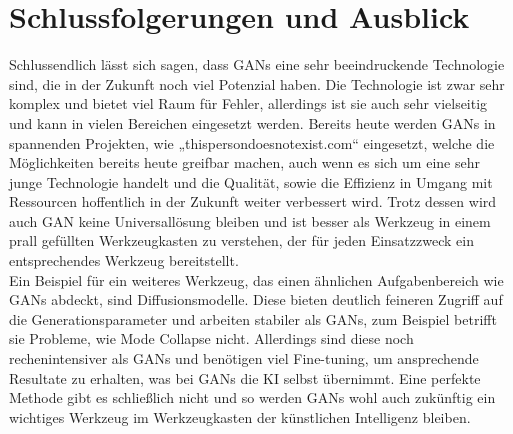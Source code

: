 \chapter{Schlussfolgerungen und Ausblick}

\noindent Schlussendlich lässt sich sagen, dass \acp{GAN} eine sehr beeindruckende Technologie sind, die in der Zukunft noch viel Potenzial haben. Die Technologie ist zwar sehr komplex und bietet viel Raum für Fehler, allerdings ist sie auch sehr vielseitig und kann in vielen Bereichen eingesetzt werden. Bereits heute werden \acp{GAN} in spannenden Projekten, wie „thispersondoesnotexist.com“ eingesetzt, welche die Möglichkeiten bereits heute greifbar machen, auch wenn es sich um eine sehr junge Technologie handelt und die Qualität, sowie die Effizienz in Umgang mit Ressourcen hoffentlich in der Zukunft weiter verbessert wird. Trotz dessen wird auch \ac{GAN} keine Universallösung bleiben und ist besser als Werkzeug in einem prall gefüllten Werkzeugkasten zu verstehen, der für jeden Einsatzzweck ein entsprechendes Werkzeug bereitstellt. \\

\noindent Ein Beispiel für ein weiteres Werkzeug, das einen ähnlichen Aufgabenbereich wie \acp{GAN} abdeckt, sind Diffusionsmodelle. Diese bieten deutlich feineren Zugriff auf die Generationsparameter und arbeiten stabiler als \acp{GAN}, zum Beispiel betrifft sie Probleme, wie Mode Collapse nicht. Allerdings sind diese noch rechenintensiver als \acp{GAN} und benötigen viel Fine-tuning, um ansprechende Resultate zu erhalten, was bei \acp{GAN} die KI selbst übernimmt. Eine perfekte Methode gibt es schließlich nicht und so werden \acp{GAN} wohl auch zukünftig ein wichtiges Werkzeug im Werkzeugkasten der künstlichen Intelligenz bleiben.\\

\noindent 

\newpage
